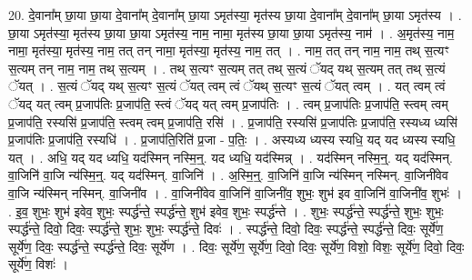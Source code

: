 \documentclass[17pt]{extarticle}
\begin{document}
20. दे॒वाना᳚म् छा॒या छा॒या दे॒वाना᳚म् दे॒वाना᳚म् छा॒या ऽमृत॑स्या॒ मृत॑स्य छा॒या दे॒वाना᳚म् दे॒वाना᳚म् छा॒या ऽमृत॑स्य । . छा॒या ऽमृत॑स्या॒ मृत॑स्य छा॒या छा॒या ऽमृत॑स्य॒ नाम॒ नामा॒ मृत॑स्य छा॒या छा॒या ऽमृत॑स्य॒ नाम॑ । . अ॒मृत॑स्य॒ नाम॒ नामा॒ मृत॑स्या॒ मृत॑स्य॒ नाम॒ तत् तन् नामा॒ मृत॑स्या॒ मृत॑स्य॒ नाम॒ तत् । . नाम॒ तत् तन् नाम॒ नाम॒ तथ् स॒त्यꣳ स॒त्यम् तन् नाम॒ नाम॒ तथ् स॒त्यम् । . तथ् स॒त्यꣳ स॒त्यम् तत् तथ् स॒त्यं ॅयद् यथ् स॒त्यम् तत् तथ् स॒त्यं ॅयत् । . स॒त्यं ॅयद् यथ् स॒त्यꣳ स॒त्यं ॅयत् त्वम् त्वं ॅयथ् स॒त्यꣳ स॒त्यं ॅयत् त्वम् । . यत् त्वम् त्वं ॅयद् यत् त्वम् प्र॒जाप॑तिः प्र॒जाप॑ति॒ स्त्वं ॅयद् यत् त्वम् प्र॒जाप॑तिः । . त्वम् प्र॒जाप॑तिः प्र॒जाप॑ति॒ स्त्वम् त्वम् प्र॒जाप॑ति॒ रस्यसि॑ प्र॒जाप॑ति॒ स्त्वम् त्वम् प्र॒जाप॑ति॒ रसि॑ । . प्र॒जाप॑ति॒ रस्यसि॑ प्र॒जाप॑तिः प्र॒जाप॑ति॒ रस्यध्य ध्यसि॑ प्र॒जाप॑तिः प्र॒जाप॑ति॒ रस्यधि॑ । . प्र॒जाप॑ति॒रिति॑ प्र॒जा - प॒तिः॒ । . अस्यध्य ध्यस्य स्यधि॒ यद् यद ध्यस्य स्यधि॒ यत् । . अधि॒ यद् यद ध्यधि॒ यद॑स्मिन् नस्मि॒न्॒. यद ध्यधि॒ यद॑स्मिन्न् । . यद॑स्मिन् नस्मि॒न्॒. यद् यद॑स्मिन्. वा॒जिनि॑ वा॒जि न्य॑स्मि॒न्॒. यद् यद॑स्मिन्. वा॒जिनि॑ । . अ॒स्मि॒न्॒. वा॒जिनि॑ वा॒जि न्य॑स्मिन् नस्मिन्. वा॒जिनी॑वेव वा॒जि न्य॑स्मिन् नस्मिन्. वा॒जिनी॑व । . वा॒जिनी॑वेव वा॒जिनि॑ वा॒जिनी॑व॒ शुभः॒ शुभ॑ इव वा॒जिनि॑ वा॒जिनी॑व॒ शुभः॑ । . इ॒व॒ शुभः॒ शुभ॑ इवेव॒ शुभः॒ स्पर्द्ध॑न्ते॒ स्पर्द्ध॑न्ते॒ शुभ॑ इवेव॒ शुभः॒ स्पर्द्ध॑न्ते । . शुभः॒ स्पर्द्ध॑न्ते॒ स्पर्द्ध॑न्ते॒ शुभः॒ शुभः॒ स्पर्द्ध॑न्ते॒ दिवो॒ दिवः॒ स्पर्द्ध॑न्ते॒ शुभः॒ शुभः॒ स्पर्द्ध॑न्ते॒ दिवः॑ । . स्पर्द्ध॑न्ते॒ दिवो॒ दिवः॒ स्पर्द्ध॑न्ते॒ स्पर्द्ध॑न्ते॒ दिवः॒ सूर्ये॑ण॒ सूर्ये॑ण॒ दिवः॒ स्पर्द्ध॑न्ते॒ स्पर्द्ध॑न्ते॒ दिवः॒ सूर्ये॑ण । . दिवः॒ सूर्ये॑ण॒ सूर्ये॑ण॒ दिवो॒ दिवः॒ सूर्ये॑ण॒ विशो॒ विशः॒ सूर्ये॑ण॒ दिवो॒ दिवः॒ सूर्ये॑ण॒ विशः॑ । \newline
\end{document}
